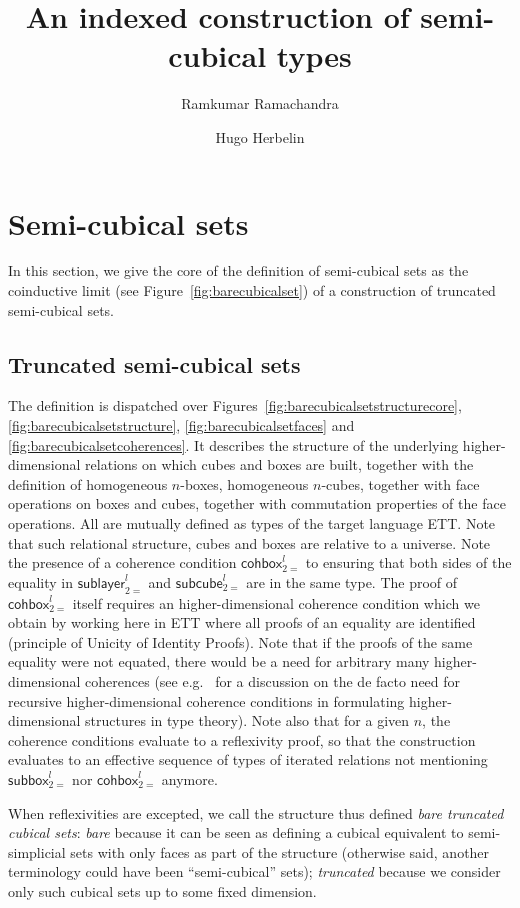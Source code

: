 \documentclass{article}
\title{An indexed construction of semi-cubical types}
\author{Ramkumar Ramachandra}
\author{Hugo Herbelin}
\newcommand{\downbox}[2][2=]{\ensuremath{\mathsf{subbox}_{#1}^{#2}}}
\newcommand{\downlayer}[2][2=]{\ensuremath{\mathsf{sublayer}_{#1}^{#2}}}
\newcommand{\downcube}[2][2=]{\ensuremath{\mathsf{subcube}_{#1}^{#2}}}
\newcommand{\cohbox}[2][2=]{\ensuremath{\mathsf{cohbox}_{{#1}}^{{#2}}}}
\begin{document}
\maketitle

\tableofcontents

\section{Semi-cubical sets}

In this section, we give the core of the definition of semi-cubical
sets as the coinductive limit (see Figure~\ref{fig:barecubicalset}) of a
construction of truncated semi-cubical sets.

\subsection{Truncated semi-cubical sets}

The definition is dispatched over Figures~\ref{fig:barecubicalsetstructurecore}, \ref{fig:barecubicalsetstructure}, \ref{fig:barecubicalsetfaces} and \ref{fig:barecubicalsetcoherences}. It describes the structure of the underlying higher-dimensional relations on which cubes and boxes are built, together with the definition of homogeneous $n$-boxes, homogeneous $n$-cubes, together with face operations on boxes and cubes, together with commutation properties of the face operations. All are mutually defined as types of the target language ETT. Note that such relational structure, cubes and boxes are relative to a universe. Note the presence of a coherence condition \cohbox{l} to ensuring that both sides of the equality in \downlayer{l} and \downcube{l} are in the same type. The proof of \cohbox{l} itself requires an higher-dimensional coherence condition which we obtain by working here in ETT where all proofs of an equality are identified (principle of Unicity of Identity Proofs). Note that if the proofs of the same equality were not equated, there would be a need for arbitrary many higher-dimensional coherences (see e.g.~\cite{Herbelin15} for a discussion on the de facto need for recursive higher-dimensional coherence conditions in formulating higher-dimensional structures in type theory). Note also that for a given $n$, the coherence conditions evaluate to a reflexivity proof, so that the construction evaluates to an effective sequence of types of iterated relations not mentioning \downbox{l} nor \cohbox{l} anymore.

When reflexivities are excepted, we call the structure thus defined \emph{bare truncated cubical sets}: \emph{bare} because it can be seen as defining a cubical equivalent to semi-simplicial sets with only faces as part of the structure (otherwise said, another terminology could have been ``semi-cubical'' sets); \emph{truncated} because we consider only such cubical sets up to some fixed dimension.
\end{document}
